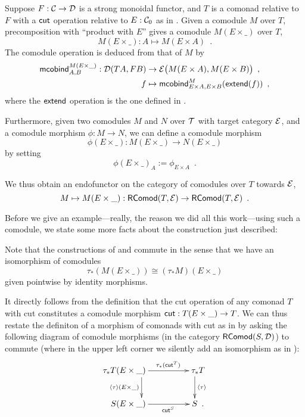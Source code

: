 \documentclass[conference,10pt]{IEEEtran}
\renewcommand{\alpha}{\phi}
\begin{document}
\begin{definition}\label{def:product_in_context}
 Suppose $F:{\mathcal{C}}\to\mathcal{D}$ is a strong monoidal functor, and $T$ is a comonad relative to $F$ with a $\mathsf{cut}$ operation 
 relative to $E:{\mathcal{C}}_0$ as in .
 Given a comodule $M$ over $T$,  precomposition with \enquote{product with $E$}
 gives a comodule $M(E\times\_)$ over $T$,
  \[    M(E\times \_) : A \mapsto M(E\times A) \enspace . \]
 The comodule operation is deduced from that of $M$ by 
 \begin{align*} \mathsf{mcobind}^{M(E\times\_)}_{A,B} : \mathcal{D}(TA,FB)&\to \mathcal{E}\bigl(M(E\times A), M(E\times B)\bigr) \enspace ,\\
                                                      f &\mapsto \mathsf{mcobind}^M_{E\times A,E\times B}(\mathsf{extend}(f)) \enspace ,
  \end{align*}                                        
where the $\mathsf{extend}$ operation is the one defined in .
 
 Furthermore, given two comodules $M$ and $N$ over $\mathcal{T}$ with target category $\mathcal{E}$, and a comodule morphism $\alpha : M \to N$,  
 we can define a comodule morphism \[\alpha(E\times \_) : M(E\times \_) \to N(E\times \_) \] by setting
          \[ \alpha(E \times \_)_A := \alpha_{E\times A} \enspace . \]
  
  \noindent
  We thus obtain an endofunctor on the category of comodules over $T$ towards $\mathcal{E}$,
   \[ M \mapsto  M (E\times \_) : \mathsf{RComod}(T,\mathcal{E}) \to \mathsf{RComod}(T,\mathcal{E}) \enspace . \]
\end{definition}


Before we give an example---really, the reason we did all this work---using such a comodule, we state some more facts about 
the construction just described:

\begin{remark}\label{rem:prod_pullback_commute}
 Note that the constructions of  and  commute in the sense that
 we have an isomorphism of comodules \[\tau_*(M(E\times \_)) \cong (\tau_*M)(E \times \_)  \]
 given pointwise by identity morphisms.
\end{remark}



It directly follows from the definition that the cut operation of any comonad $T$ with cut 
constitutes a comodule morphism $\mathsf{cut} : T(E\times \_) \to T$.
We can thus restate the definiton of a morphism of comonads with cut as in  by asking the following diagram 
of comodule morphisms (in the category $\mathsf{RComod}(S,\mathcal{D})$) to commute
(where in the upper left corner we silently add an isomorphism as in ):
 \[ \begin{xy}
       \xymatrix{  **[l] \tau_*T(E\times \_ )  \ar[r]^{\tau_*(\cut^T)} \ar[d]_{\induced{\tau}(E\times \_)}  &  **[r] \tau_*T \ar[d]^{\induced{\tau}} \\
                   **[l]  S (E\times \_ ) \ar[r]_{\cut^S}  &  **[r] S  \enspace .
        }
      \end{xy}
   \]
\end{document}
